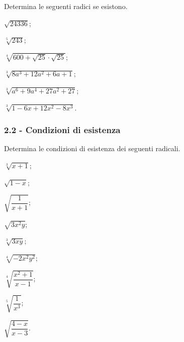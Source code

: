 \begin{esercizio}[\Ast]
 \label{ese:2.10}
Determina le seguenti radici se esistono.
 \begin{multicols}{3}
 \begin{enumeratea}
 \item $\sqrt{24336}$;
 \item $\sqrt[5]{243}$;
 \item $\sqrt[4]{600+\sqrt{25}\cdot \sqrt{25}}$;
 \item $\sqrt[3]{8a^3+12a^2+6a+1}$;
 \item $\sqrt[3]{a^6+9a^4+27a^2+27}$;
 \item $\sqrt[3]{1-6x+12x^2-8x^3}$.
 \end{enumeratea}
 \end{multicols}
\end{esercizio}

\subsubsection*{2.2 - Condizioni di esistenza}

\begin{esercizio}[\Ast]
 \label{ese:2.11}
Determina le condizioni di esistenza dei seguenti radicali.
 \begin{multicols}{3}
 \begin{enumeratea}
 \item $\sqrt[3]{x+1}$;
 \item $\sqrt{1-x}$;
 \item $\sqrt{\dfrac 1{x+1}}$;
 \item $\sqrt{3x^2y}$;
 \item $\sqrt[3]{3xy}$;
 \item $\sqrt[4]{-2x^2y^2}$;
 \item $\sqrt[4]{\dfrac{x^2+1}{x-1}}$;
 \item $\sqrt[5]{\dfrac 1{x^3}}$;
 \item $\sqrt{\dfrac{4-x}{x-3}}$.
 \end{enumeratea}
 \end{multicols}
\end{esercizio}

